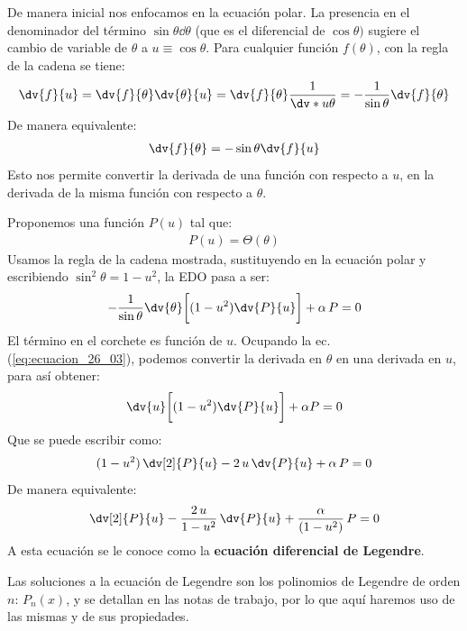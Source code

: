 De manera inicial nos enfocamos en la ecuación polar. La presencia en el denominador del término $\sin \theta \dd{\theta}$ (que es el diferencial de $\cos \theta)$ sugiere el cambio de variable de $\theta$ a $u \equiv \cos \theta$. Para cualquier función $f (\theta)$, con la regla de la cadena se tiene:
\begin{align*}
\dv{f}{u} = \dv{f}{\theta} \dv{\theta}{u} = \dv{f}{\theta} \dfrac{1}{\dv*{u}{\theta}} = - \dfrac{1}{\sin \theta} \dv{f}{\theta}
\end{align*}
De manera equivalente:
\begin{align}
\dv{f}{\theta} = - \sin \theta \dv{f}{u}
\label{eq:ecuacion_26_03}
\end{align}
Esto nos permite convertir la derivada de una función con respecto a $u$, en la derivada de la misma función con respecto a $\theta$.
\par
Proponemos una función $P(u)$ tal que:
\begin{align*}
P(u) = \Theta(\theta)
\end{align*}
Usamos la regla de la cadena mostrada, sustituyendo en la ecuación polar y escribiendo $\sin^{2} \theta = 1 - u^{2}$, la EDO pasa a ser:
\begin{align*}
- \dfrac{1}{\sin \theta} \dv{\theta} \bigg[ (1 - u^{2}) \dv{P}{u} \bigg] + \alpha \, P = 0
\end{align*}
El término en el corchete es función de $u$. Ocupando la ec. (\ref{eq:ecuacion_26_03}), podemos convertir la derivada en $\theta$ en una derivada en $u$, para así obtener:
\begin{align}
\dv{u} \bigg[ (1 - u^{2}) \dv{P}{u} \bigg] + \alpha P = 0
\label{eq:ecuacion_26_04}
\end{align}
Que se puede escribir como:
\begin{align}
(1 - u^{2}) \, \dv[2]{P}{u} - 2 \, u \, \dv{P}{u} + \alpha \, P = 0
\label{eq:ecuacion_26_05}
\end{align}
De manera equivalente:
\begin{align}
\dv[2]{P}{u} - \dfrac{2 \, u}{1 - u^{2}} \, \dv{P}{u} + \dfrac{\alpha}{(1 - u^{2})} \, P = 0
\label{eq:ecuacion_26_06}
\end{align}
A esta ecuación se le conoce como la \textbf{ecuación diferencial de Legendre}.
\par
Las soluciones a la ecuación de Legendre son los polinomios de Legendre de orden $n$: $P_{n} (x)$, y se detallan en las notas de trabajo, por lo que aquí haremos uso de las mismas y de sus propiedades.

